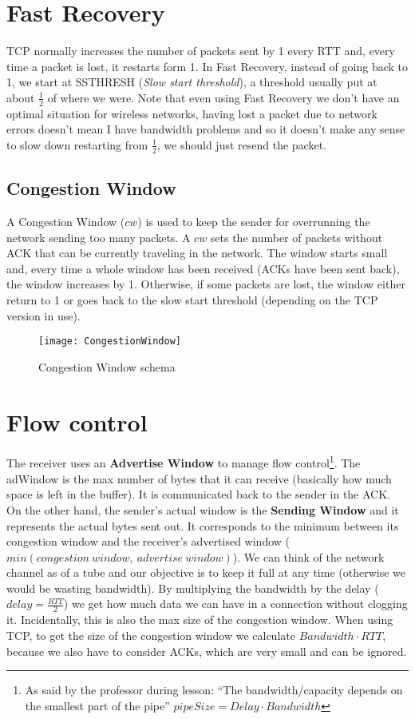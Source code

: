 \section{Fast Recovery}

TCP normally increases the number of 
packets sent by 1 every RTT and, every time a packet is lost, it restarts form
1. In Fast Recovery, instead of going back to 1, we start at SSTHRESH
(\textit{Slow start threshold}), a threshold usually put at about $\frac{1}{2}$
of where we were. Note that even using Fast Recovery we don't have an optimal
situation for wireless networks, having lost a packet due to network errors
doesn't mean I have bandwidth problems and so it doesn't make any sense to slow
down restarting from $\frac{1}{2}$, we should just resend the packet.

\subsection{Congestion Window}
A Congestion Window ($cw$) is used to keep the sender for overrunning the
network sending too many packets. A $cw$ sets the number of packets without ACK
that can be currently traveling in the network. The window starts small and,
every time a whole window has been received (ACKs have been sent back), the
window increases by 1. Otherwise, if some packets are lost, the window either
return to 1 or goes back to the slow start threshold (depending on the TCP
version in use).
\begin{figure}[h]
  \centering
  \texttt{[image: CongestionWindow]}
  \caption{Congestion Window schema}
  \label{fig:tcp:cwschema}
\end{figure}

\section{Flow control}

The receiver uses an \textbf{Advertise Window} to manage flow control\footnote{
  As said by the professor during lesson: ``The bandwidth/capacity depends on
  the smallest part of the pipe'' $pipeSize = Delay \cdot Bandwidth$
}. The adWindow is the max number of bytes that it can receive (basically how
much space is left in the buffer). It is communicated back to the sender in the
ACK. 
On the other hand, the sender's actual window is the \textbf{Sending Window} and 
it represents the actual bytes sent out. It corresponds to the minimum between 
its congestion window and the receiver's advertised window
($min(congestion\ window,\ advertise\ window)$). 
We can think of the network channel as of a tube and our objective is to 
keep it full at any time (otherwise we would be wasting bandwidth). By
multiplying the bandwidth by the delay ($delay = \frac{RTT}{2}$) we get how much
data we can have in a connection without clogging it. Incidentally, this is also
the max size of the congestion window. When using TCP, to get the size of the
congestion window we calculate $Bandwidth \cdot RTT$, because we also have to
consider ACKs, which are very small and can be ignored.

